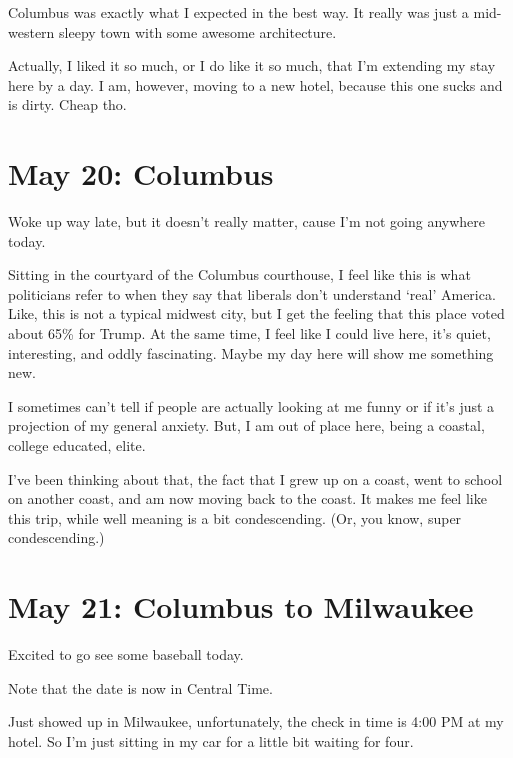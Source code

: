 \documentclass[../butidigress.tex]{subfiles}
\begin{document}
\entryskip

Columbus was exactly what I expected in the best way.
It really was just a mid-western sleepy town with some awesome architecture.

Actually, I liked it so much, or I do like it so much, that I'm extending my stay here by a day.
I am, however, moving to a new hotel, because this one sucks and is dirty.
Cheap tho.

\section{May 20: Columbus}
Woke up way late, but it doesn't really matter, cause I'm not going anywhere today.

\entryskip

Sitting in the courtyard of the Columbus courthouse, I feel like this is what politicians refer to when they say that liberals don't understand `real' America.
Like, this is not a typical midwest city, but I get the feeling that this place voted about 65\% for Trump.
At the same time, I feel like I could live here, it's quiet, interesting, and oddly fascinating.
Maybe my day here will show me something new.

I sometimes can't tell if people are actually looking at me funny or if it's just a projection of my general anxiety.
But, I am out of place here, being a coastal, college educated, elite.

I've been thinking about that, the fact that I grew up on a coast, went to school on another coast, and am now moving back to the coast.
It makes me feel like this trip, while well meaning is a bit condescending.
(Or, you know, super condescending.)

\section{May 21: Columbus to Milwaukee}
Excited to go see some baseball today.

\entryskip

Note that the date is now in Central Time.

Just showed up in Milwaukee, unfortunately, the check in time is 4:00 PM at my hotel.
So I'm just sitting in my car for a little bit waiting for four.
\end{document}
